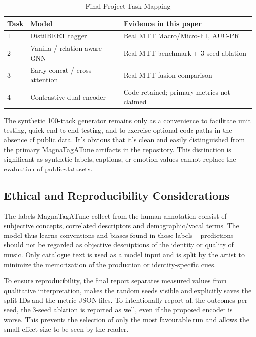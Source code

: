 \documentclass[conference]{IEEEtran}
\begin{document}
\begin{table}[t]
\caption{Final Project Task Mapping}
\label{tab:taskmap}
\centering
\scriptsize
\setlength{\tabcolsep}{3pt}
\begin{tabular}{p{0.7cm}p{2.25cm}p{2.7cm}}
\toprule
Task & Model & Evidence in this paper\\
\midrule
1 & DistilBERT tagger & Real MTT Macro/Micro-F1, AUC-PR\\
2 & Vanilla / relation-aware GNN & Real MTT benchmark + 3-seed ablation\\
3 & Early concat / cross-attention & Real MTT fusion comparison\\
4 & Contrastive dual encoder & Code retained; primary metrics not claimed\\
\bottomrule
\end{tabular}
\end{table}

The synthetic 100-track generator remains only as a convenience to facilitate unit testing, quick end-to-end testing, and to exercise optional code paths in the absence of public data. It's obvious that it's clean and easily distinguished from the primary MagnaTagATune artifacts in the repository. This distinction is significant as synthetic labels, captions, or emotion values cannot replace the evaluation of public-datasets.

\subsection{Ethical and Reproducibility Considerations}
The labels MagnaTagATune collect from the human annotation consist of subjective concepts, correlated descriptors and demographic/vocal terms. The model thus learns conventions and biases found in those labels – predictions should not be regarded as objective descriptions of the identity or quality of music. Only catalogue text is used as a model input and is split by the artist to minimize the memorization of the production or identity-specific cues.

To ensure reproducibility, the final report separates measured values from qualitative interpretation, makes the random seeds visible and explicitly saves the split IDs and the metric JSON files. To intentionally report all the outcomes per seed, the 3-seed ablation is reported as well, even if the proposed encoder is worse. This prevents the selection of only the most favourable run and allows the small effect size to be seen by the reader.
\end{document}
